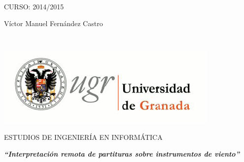 \begin{center}
\vspace*{3cm} 
\par\end{center}

\begin{center}
{\large CURSO: 2014/2015}
\par\end{center}{\large \par}

\begin{center}
{\large Víctor Manuel Fernández Castro}
\par\end{center}{\large \par}

\newpage
\thispagestyle{empty}

~

\newpage
\thispagestyle{empty}

\begin{center}
\includegraphics[scale=0.2]{logo_ugr}
\par\end{center}

\begin{center}
ESTUDIOS DE INGENIERÍA EN INFORMÁTICA
\par\end{center}

\begin{center}
\vspace*{0.1cm}
\par\end{center}

\begin{center}
\textbf{\emph{\Large {}``Interpretación remota de partituras sobre instrumentos de viento''}}
\par\end{center}{\Large \par}

\begin{center}
\vspace*{0.3cm}
\par\end{center}

